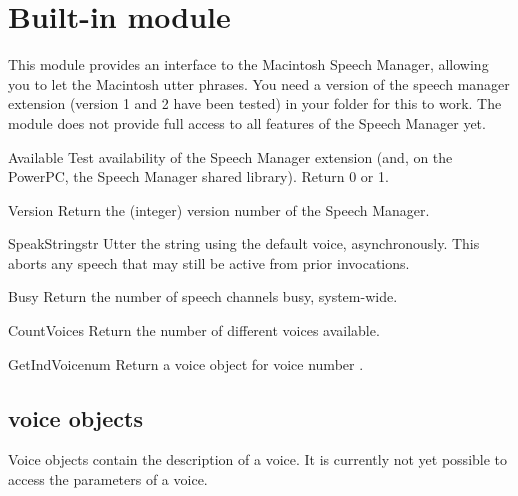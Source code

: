 \section{Built-in module }

\renewcommand{\indexsubitem}{(in module macspeech)}

This module provides an interface to the Macintosh Speech Manager,
allowing you to let the Macintosh utter phrases. You need a version of
the speech manager extension (version 1 and 2 have been tested) in
your  folder for this to work. The module does not
provide full access to all features of the Speech Manager yet.

\begin{funcdesc}{Available}{}
Test availability of the Speech Manager extension (and, on the
PowerPC, the Speech Manager shared library). Return 0 or 1. 
\end{funcdesc}

\begin{funcdesc}{Version}{}
Return the (integer) version number of the Speech Manager.
\end{funcdesc}

\begin{funcdesc}{SpeakString}{str}
Utter the string  using the default voice,
asynchronously. This aborts any speech that may still be active from
prior  invocations.
\end{funcdesc}

\begin{funcdesc}{Busy}{}
Return the number of speech channels busy, system-wide.
\end{funcdesc}

\begin{funcdesc}{CountVoices}{}
Return the number of different voices available.
\end{funcdesc}

\begin{funcdesc}{GetIndVoice}{num}
Return a voice object for voice number .
\end{funcdesc}

\subsection{voice objects}
Voice objects contain the description of a voice. It is currently not
yet possible to access the parameters of a voice.

\renewcommand{\indexsubitem}{(voice object method)}

